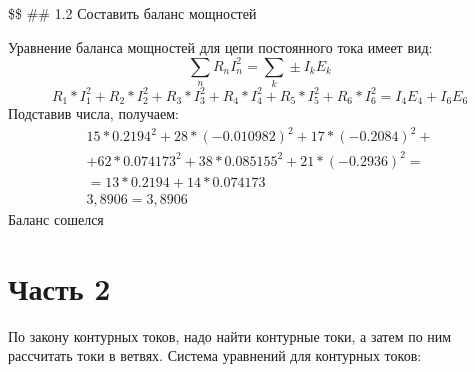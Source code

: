 \documentclass[
]{article}
\begin{document}

\$\$ \#\# 1.2 Составить баланс мощностей

Уравнение баланса мощностей для цепи постоянного тока имеет вид: \[
\sum_{n}R_{n}I_{n}^2 = \sum_{k}\pm I_{k}E_{k}
\] \[
R_{1}*I_{1}^2 + R_{2}*I_{2}^2 + R_{3}*I_{3}^2 + R_{4}*I_{4}^2 + R_{5}*I_{5}^2 + R_{6}*I_{6}^2 = I_{4}E_{4} + I_{6}E_{6}
\] Подставив числа, получаем: \[\begin{gather}
15 * 0.2194 ^ 2 + 28 * (-0.010982)^2 + 17 * (-0.2084)^2 + \\ + 62 * 0.074173^2 + 38 * 0.085155^2 + 21 * (-0.2936)^2 =\\= 13 * 0.2194 + 14 * 0.074173
\\
3,8906 = 3,8906
\end{gather}\] Баланс сошелся

\section{Часть 2}\label{ux447ux430ux441ux442ux44c-2}

По закону контурных токов, надо найти контурные токи, а затем по ним
рассчитать токи в ветвях. Система уравнений для контурных токов:
\end{document}
